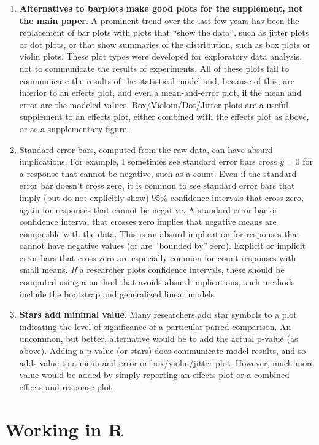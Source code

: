 \documentclass[]{book}
\providecommand{\tightlist}{%
  \setlength{\itemsep}{0pt}\setlength{\parskip}{0pt}}
\begin{document}
\begin{enumerate}
\def\labelenumi{\arabic{enumi}.}
\tightlist
\item
  \textbf{Alternatives to barplots make good plots for the supplement, not the main paper}. A prominent trend over the last few years has been the replacement of bar plots with plots that ``show the data'', such as jitter plots or dot plots, or that show summaries of the distribution, such as box plots or violin plots. These plot types were developed for exploratory data analysis, not to communicate the results of experiments. All of these plots fail to communicate the results of the statistical model and, because of this, are inferior to an effects plot, and even a mean-and-error plot, if the mean and error are the modeled values. Box/Violoin/Dot/Jitter plots are a useful supplement to an effects plot, either combined with the effects plot as above, or as a supplementary figure.
\item
  Standard error bars, computed from the raw data, can have absurd implications. For example, I sometimes see standard error bars cross \(y=0\) for a response that cannot be negative, such as a count. Even if the standard error bar doesn't cross zero, it is common to see standard error bars that imply (but do not explicitly show) 95\% confidence intervals that cross zero, again for responses that cannot be negative. A standard error bar or confidence interval that crosses zero implies that negative means are compatible with the data. This is an absurd implication for responses that cannot have negative values (or are ``bounded by'' zero). Explicit or implicit error bars that cross zero are especially common for count responses with small means. \emph{If} a researcher plots confidence intervals, these should be computed using a method that avoids absurd implications, such methods include the bootstrap and generalized linear models.
\item
  \textbf{Stars add minimal value}. Many researchers add star symbols to a plot indicating the level of significance of a particular paired comparison. An uncommon, but better, alternative would be to add the actual p-value (as above). Adding a p-value (or stars) does communicate model results, and so adds value to a mean-and-error or box/violin/jitter plot. However, much more value would be added by simply reporting an effects plot or a combined effects-and-response plot.
\end{enumerate}

\hypertarget{working-in-r}{%
\section{Working in R}\label{working-in-r}}
\end{document}
